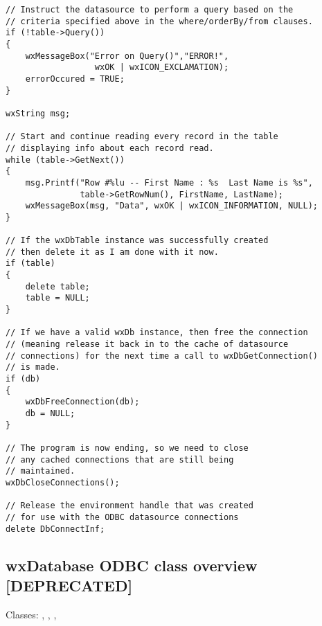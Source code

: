 \begin{verbatim}
// Instruct the datasource to perform a query based on the 
// criteria specified above in the where/orderBy/from clauses.
if (!table->Query())
{
    wxMessageBox("Error on Query()","ERROR!",
                  wxOK | wxICON_EXCLAMATION);
    errorOccured = TRUE;
}

wxString msg;

// Start and continue reading every record in the table
// displaying info about each record read.
while (table->GetNext())
{
    msg.Printf("Row #%lu -- First Name : %s  Last Name is %s",
               table->GetRowNum(), FirstName, LastName);
    wxMessageBox(msg, "Data", wxOK | wxICON_INFORMATION, NULL);
}

// If the wxDbTable instance was successfully created
// then delete it as I am done with it now.
if (table)
{
    delete table;
    table = NULL;
}

// If we have a valid wxDb instance, then free the connection
// (meaning release it back in to the cache of datasource
// connections) for the next time a call to wxDbGetConnection()
// is made.
if (db)
{
    wxDbFreeConnection(db);
    db = NULL;
}

// The program is now ending, so we need to close
// any cached connections that are still being 
// maintained.
wxDbCloseConnections();

// Release the environment handle that was created
// for use with the ODBC datasource connections
delete DbConnectInf;

\end{verbatim}


\subsection{wxDatabase ODBC class overview [DEPRECATED]}\label{wxodbcoverview}

Classes: , , ,
\rtfsp{}


